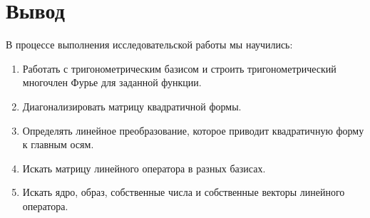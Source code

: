 \section{Вывод}
В процессе выполнения исследовательской работы мы научились:
\begin{enumerate}
  \item Работать с тригонометрическим базисом
    и строить тригонометрический многочлен Фурье для заданной функции.
  \item Диагонализировать матрицу квадратичной формы.
  \item Определять линейное преобразование,
    которое приводит квадратичную форму к главным осям.
  \item Искать матрицу линейного оператора в разных базисах.
  \item Искать ядро, образ, собственные числа
    и собственные векторы линейного оператора.
\end{enumerate}
